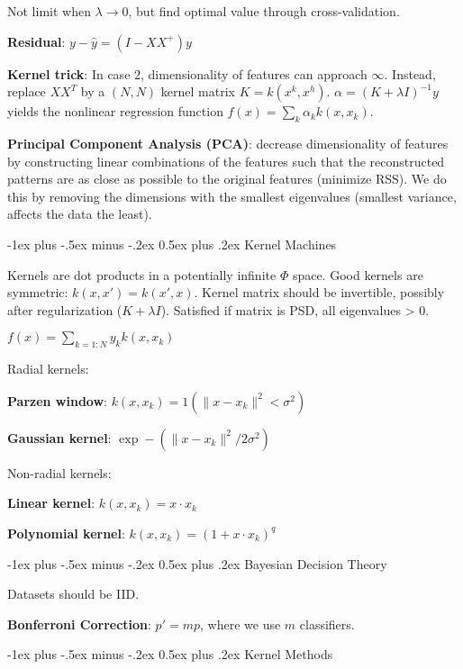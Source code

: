 \documentclass[10pt,landscape]{article}
\makeatletter
\renewcommand{\section}{\@startsection{section}{1}{0mm}%
                                {-1ex plus -.5ex minus -.2ex}%
                                {0.5ex plus .2ex}%
                                {\normalfont\large\bfseries}}
\makeatother
\begin{document}
\begin{multicols}{3}
Not limit when $\lambda \rightarrow 0$, but find optimal value through cross-validation.

\textbf{Residual}: $y-\hat{y} = (I-XX^+)y$

\textbf{Kernel trick}: In case 2, dimensionality of features can approach $\infty$. Instead, replace $XX^T$ by a $(N, N)$ kernel matrix $K = k(x^k, x^h)$. $\alpha = (K + \lambda I)^{-1} y$ yields the nonlinear regression function $f(x) = \sum_k \alpha_k k(x, x_k)$.

\textbf{Principal Component Analysis (PCA)}: decrease dimensionality of features by constructing linear combinations of the features such that the reconstructed patterns are as close as possible to the original features (minimize RSS). We do this by removing the dimensions with the smallest eigenvalues (smallest variance, affects the data the least).

\section{Kernel Machines}

Kernels are dot products in a potentially infinite $\Phi$ space.
Good kernels are symmetric: $k(x, x') = k(x', x)$.
Kernel matrix should be invertible, possibly after regularization ($K+\lambda I$). Satisfied if matrix is PSD, all eigenvalues > 0.

$f(x) = \sum_{k=1:N} y_k k(x, x_k)$

Radial kernels:

\textbf{Parzen window}: $k(x, x_k) = 1(\lVert x - x_k \rVert^2 < \sigma^2)$

\textbf{Gaussian kernel}: $\exp -(\lVert x - x_k \rVert^2 / 2\sigma^2)$

Non-radial kernels:

\textbf{Linear kernel}: $k(x, x_k) = x \cdot x_k$

\textbf{Polynomial kernel}: $k(x, x_k) = (1 + x \cdot x_k)^q$


\section{Bayesian Decision Theory}

Datasets should be IID.

\textbf{Bonferroni Correction}: $p' = mp$, where we use $m$ classifiers.

\section{Kernel Methods}



\end{multicols}
\end{document}
